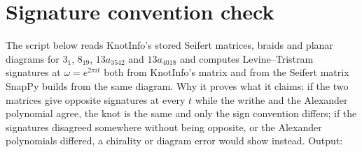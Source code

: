 \documentclass[11pt]{article}
\theoremstyle{definition}
\begin{document}
\section{Signature convention check}\label{app:sig}
The script below reads KnotInfo's stored Seifert matrices, braids and planar diagrams for $3_1$, $8_{19}$, $13a_{3542}$ and $13a_{4018}$ and computes Levine--Tristram signatures at $\omega=e^{2\pi i t}$ both from KnotInfo's matrix and from the Seifert matrix SnapPy builds from the same diagram. Why it proves what it claims: if the two matrices give opposite signatures at every $t$ while the writhe and the Alexander polynomial agree, the knot is the same and only the sign convention differs; if the signatures disagreed somewhere without being opposite, or the Alexander polynomials differed, a chirality or diagram error would show instead.
\noindent Output:
\end{document}
